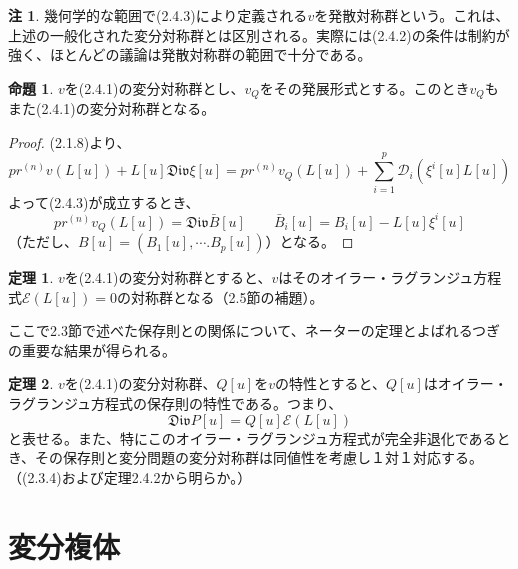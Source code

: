 \documentclass[a4paper, 11pt]{report}
\theoremstyle{definition}
\newtheorem{theorem}{定理}[section]
\newtheorem{proposition}{命題}[section]
\newtheorem*{remark*}{注}
\begin{document}
\begin{remark*}
 幾何学的な範囲で(2.4.3)により定義される$v$を発散対称群という。これは、上述の一般化された変分対称群とは区別される。実際には(2.4.2)の条件は制約が強く、ほとんどの議論は発散対称群の範囲で十分である。
\end{remark*}

\begin{proposition}
 $v$を(2.4.1)の変分対称群とし、$v_Q$をその発展形式とする。このとき$v_Q$もまた(2.4.1)の変分対称群となる。
\end{proposition}

\begin{proof}
 (2.1.8)より、
\begin{equation*}
pr^{(n)}v(L[u]) + L[u]\mathfrak{Div}\xi[u] = pr^{(n)}v_Q(L[u]) + \sum^p_{i=1}\mathcal{D}_i(\xi^i[u]L[u])
\end{equation*}
よって(2.4.3)が成立するとき、
\begin{equation}
pr^{(n)}v_Q(L[u]) = \mathfrak{Div} \bar{B}[u]\qquad \bar{B}_i[u] = B_i[u] - L[u]\xi^i[u] %
\end{equation}
（ただし、$B[u]=(B_1[u],\cdots.B_p[u])$）となる。
\end{proof}

\begin{theorem}
 $v$を(2.4.1)の変分対称群とすると、$v$はそのオイラー・ラグランジュ方程式$\mathcal{E}(L[u])=0$の対称群となる（2.5節の補題）。
\end{theorem}

 ここで2.3節で述べた保存則との関係について、ネーターの定理とよばれるつぎの重要な結果が得られる。

\begin{theorem}
 $v$を(2.4.1)の変分対称群、$Q[u]$を$v$の特性とすると、$Q[u]$はオイラー・ラグランジュ方程式の保存則の特性である。つまり、
\begin{equation}
\mathfrak{Div}P[u] = Q[u]\mathcal{E}(L[u])
\end{equation}
と表せる。また、特にこのオイラー・ラグランジュ方程式が完全非退化であるとき、その保存則と変分問題の変分対称群は同値性を考慮し１対１対応する。（(2.3.4)および定理2.4.2から明らか。）
\end{theorem}

\section{変分複体}
\end{document}
